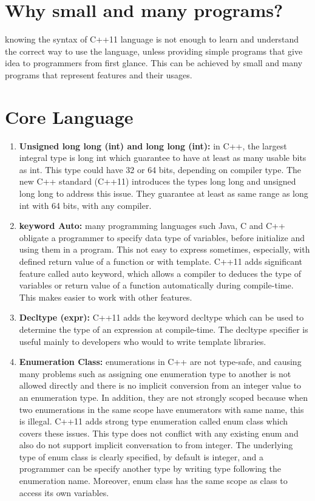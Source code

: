 \documentclass[11pt]{report}
\begin{document}
\section{Why small and many programs?}
\label{section: why small and many programs}
knowing the syntax of C++11 language is not enough to learn and understand the correct way to use the language, unless providing  simple  programs that give idea to programmers from first glance. This can be achieved by small and many programs that represent features and their usages.


\section{Core Language}
\label{section: core language}
 \begin{enumerate}
\item \textbf{Unsigned long long (int) and long long (int):} in C++, the largest integral type is long int which guarantee to have at least as many  usable bits as int. This type could have 32 or 64 bits, depending on compiler type. The new C++ standard (C++11) introduces the types long long and  unsigned long long to address this issue. They guarantee at least as same range as long int with 64 bits, with any compiler\cite{Gregorie:professionalcpp}.

\item \textbf{keyword Auto:} many programming languages such Java, C and C++ obligate a programmer to specify data type of variables, before initialize  and using them in a program. This not easy to express sometimes, especially, with defined return value of a function or with template. C++11 adds significant feature called auto keyword, which allows a compiler to deduces the type of variables or return value of a function automatically during compile-time. This makes easier to work with other features\cite{Prata:2012:Cpp}.

\item \textbf{Decltype (expr):} C++11 adds the keyword decltype which can be used to determine the type of an expression at compile-time. The decltype specifier is useful mainly to developers who would to write template libraries\cite{Gregorie:professionalcpp}.

\item  \textbf{Enumeration Class:} enumerations in C++ are not type-safe, and causing many problems such as assigning one enumeration type to another is not allowed directly and there is no implicit conversion from an integer value to an enumeration type. In addition, they are not strongly scoped because when two enumerations in the same scope have enumerators with same name, this is illegal. C++11 adds strong type enumeration called enum class which covers these issues. This type does not conflict with any existing enum and also do not support implicit conversation to from integer. The underlying type of enum class is clearly specified, by default is integer, and a programmer can be specify another type by writing type following the enumeration name. Moreover, enum class has the same scope as class to access its own variables\cite{Gregorie:professionalcpp}.
  

\end{enumerate}
\end{document}
